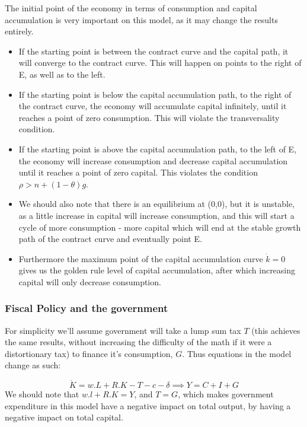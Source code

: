 The initial point of the economy in terms of consumption and capital accumulation is very important on this model, as it may change the results entirely. 
    \begin{itemize}
        \item If the starting point is between the contract curve and the capital path, it will converge to the contract curve. This will happen on points to the right of E, as well as to the left. 
        \item If the starting point is below the capital accumulation path, to the right of the contract curve, the economy will accumulate capital infinitely, until it reaches a point of zero consumption. This will violate the transversality condition.
        \item If the starting point is above the capital accumulation path, to the left of E, the economy will increase consumption and decrease capital accumulation until it reaches a point of zero capital. This violates the condition $\rho>n+(1-\theta)g$.
        \item We should also note that there is an equilibrium at (0,0), but it is unstable, as a little increase in capital will increase consumption, and this will start a cycle of more consumption - more capital which will end at the stable growth path of the contract curve and eventually point E.
        \item Furthermore the maximum point of the capital accumulation curve $\dot{k}=0$ gives us the golden rule level of capital accumulation, after which increasing capital will only decrease consumption. 
    \end{itemize}

\subsubsection{Fiscal Policy and the government}
For simplicity we'll assume government will take a lump sum tax $T$ (this achieves the same results, without increasing the difficulty of the math if it were a distortionary tax) to finance it's consumption, $G$. Thus equations in the model change as such: 

\begin{equation*}
    \dot{K}=w.L+R.K-T-c-\delta \implies Y=C+I+G
\end{equation*}
We should note that $w.l+R.K=Y$, and $T=G$, which makes government expenditure in this model have a negative impact on total output, by having a negative impact on total capital. 


